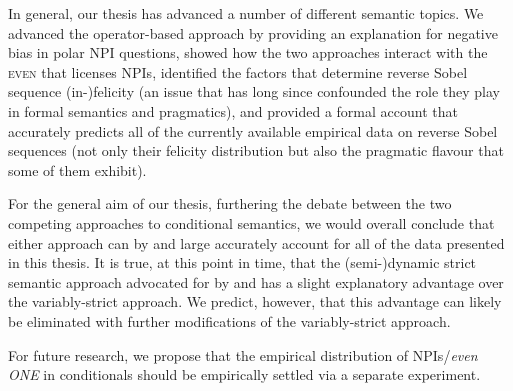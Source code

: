 In general, our thesis has advanced a number of different semantic topics. We advanced the operator-based approach by providing an explanation for negative bias in polar NPI questions, showed how the two approaches interact with the {\scshape even} that licenses NPIs, identified the factors that determine reverse Sobel sequence (in-)felicity (an issue that has long since confounded the role they play in formal semantics and pragmatics), and provided a formal account that accurately predicts all of the currently available empirical data on reverse Sobel sequences (not only their felicity distribution but also the pragmatic flavour that some of them exhibit).

For the general aim of our thesis, furthering the debate between the two competing approaches to conditional semantics, we would overall conclude that either approach can by and large accurately account for all of the data presented in this thesis. It is true, at this point in time, that the (semi-)dynamic strict semantic approach advocated for by \textcite{Fintel2001} and \textcite{Gillies2007} has a slight explanatory advantage over the variably-strict approach. We predict, however, that this advantage can likely be eliminated with further modifications of the variably-strict approach.

For future research, we propose that the empirical distribution of NPIs/\textit{even ONE} in conditionals should be empirically settled via a separate experiment.